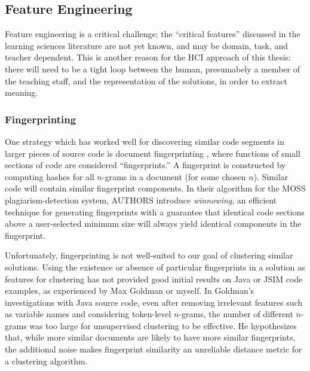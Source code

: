 \documentclass[12pt]{article}
\begin{document}
\subsection{Feature Engineering}

Feature engineering is a critical challenge; the ``critical features'' discussed in the learning sciences literature are not yet known, and may be domain, task, and teacher dependent. This is another reason for the HCI approach of this thesis: there will need to be a tight loop between the human, presumabely a member of the teaching staff, and the representation of the solutions, in order to extract meaning.

\subsubsection{Fingerprinting}

One strategy which has worked well for discovering similar code segments in larger pieces of source code is document fingerprinting \cite{MossFolks}, where functions of small sections of code are considered ``fingerprints.'' A fingerprint is constructed by computing hashes for all $n$-grams in a document (for some chosen $n$). Similar code will contain similar fingerprint components. In their algorithm for the MOSS plagiarism-detection system, AUTHORS \cite{MossFolks} introduce \emph{winnowing}, an efficient technique for generating fingerprints with a guarantee that identical code sections above a user-selected minimum size will always yield identical components in the fingerprint.

Unfortunately, fingerprinting is not well-suited to our goal of clustering similar solutions. Using the existence or absence of particular fingerprints in a solution as features for clustering has not provided good initial results on Java or JSIM code examples, as experienced by Max Goldman or myself. In Goldman's investigations with Java source code, even after removing irrelevant features such as variable names and considering token-level $n$-grams, the number of different $n$-grams was too large for unsupervised clustering to be effective. He hypothesizes that, while more similar documents are likely to have more similar fingerprints, the additional noise makes fingerprint similarity an unreliable distance metric for a clustering algorithm.


\end{document}
